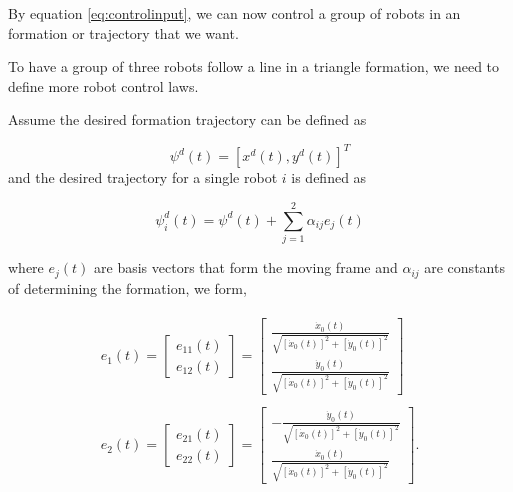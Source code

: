 \documentclass[12pt]{article}
\begin{document}
By equation \ref{eq:controlinput}, we can now control a group of robots in an formation or trajectory that we want.

To have a group of three robots follow a line in a triangle formation, we need to define more robot control laws.

Assume the desired formation trajectory can be defined as

\begin{equation}
	\psi^d(t) = [x^d(t), y^d(t)]^T \label{eq:desiredformation}
\end{equation}
and the desired trajectory for a single robot $i$ is defined as

\begin{equation}
	\psi_i^d(t) = \psi^d(t) + \sum_{j=1}^2 \alpha_{ij} e_j(t)  \label{eq:trajectory}
\end{equation}

where $e_j(t)$ are basis vectors that form the moving frame and $\alpha_{ij}$ are constants of determining the formation, we form,

\begin{eqnarray}
	\begin{array}{ll}

		e_1(t) = \left[\begin{array}{c} e_{11}(t) \\ e_{12}(t) \end{array} \right] = \left[ \begin{array}{c} \displaystyle \frac{\dot{x}_0(t)}{\sqrt{[\dot{x}_0(t)]^2+
		[\dot{y}_0(t)]^2}} \\ \displaystyle
		\frac{\dot{y}_0(t)}{\sqrt{[\dot{x}_0(t)]^2+ [\dot{y}_0(t)]^2}}
		\end{array} \right] \\ \\

		e_2(t) = \left[\begin{array}{c} e_{21}(t) \\ e_{22}(t) \end{array} \right] = \left[ \begin{array}{c}
		\displaystyle -\frac{\dot{y}_0(t)}{\sqrt{[\dot{x}_0(t)]^2+
		[\dot{y}_0(t)]^2}} \\ \displaystyle
		\frac{\dot{x}_0(t)}{\sqrt{[\dot{x}_0(t)]^2+ [\dot{y}_0(t)]^2}}
		\end{array} \right].
	\end{array} \label{eq:vectors}
\end{eqnarray}
\end{document}
